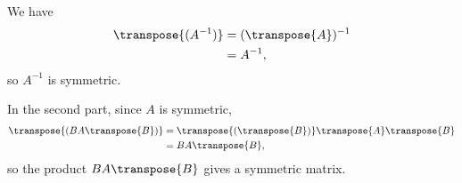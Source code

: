 We have
\begin{align*}
    \transpose{(A^{-1})} &= (\transpose{A})^{-1} \\
    &= A^{-1},
\end{align*}
so $A^{-1}$ is symmetric.

In the second part, since $A$ is symmetric,
\begin{align*}
    \transpose{(BA\transpose{B})} &= \transpose{(\transpose{B})}\transpose{A}\transpose{B} \\
    &= BA\transpose{B},
\end{align*}
so the product $BA\transpose{B}$ gives a symmetric matrix.
